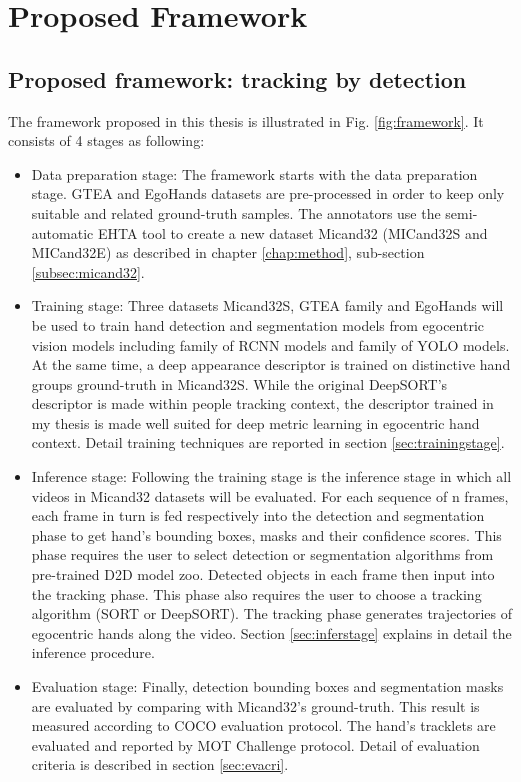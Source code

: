 \chapter{Proposed Framework}\label{chap:framework}
\section{Proposed framework: tracking by detection}
The framework proposed in this thesis is illustrated in Fig. \ref{fig:framework}. It consists of 4 stages as following:
\begin{itemize}

\item Data preparation stage: The framework starts with the data preparation stage. GTEA and EgoHands datasets are pre-processed in order to keep only suitable and related ground-truth samples. The annotators use the semi-automatic EHTA tool to create a new dataset Micand32 (MICand32S and MICand32E) as described in chapter \ref{chap:method}, sub-section \ref{subsec:micand32}.
\item Training stage: Three datasets Micand32S, GTEA family and EgoHands will be used to train hand detection and segmentation models from egocentric vision models including family of RCNN models and family of YOLO models. At the same time, a deep appearance descriptor is trained on distinctive hand groups ground-truth in Micand32S. While the original DeepSORT's descriptor is made within people tracking context, the descriptor trained in my thesis is made well suited for deep metric learning in egocentric hand context. Detail training techniques are reported in section \ref{sec:trainingstage}.
\item Inference stage: Following the training stage is the inference stage in which all videos in Micand32 datasets will be evaluated. For each sequence of n frames, each frame in turn is fed respectively into the detection and segmentation phase to get hand’s bounding boxes, masks and their confidence scores. This phase requires the user to select detection or segmentation algorithms from pre-trained D2D model zoo. Detected objects in each frame then input into the tracking phase. This phase also requires the user to choose a tracking algorithm (SORT or DeepSORT). The tracking phase generates trajectories of egocentric hands along the video. Section \ref{sec:inferstage} explains in detail the inference procedure.
\item Evaluation stage: Finally, detection bounding boxes and segmentation masks are evaluated by comparing with Micand32’s ground-truth. This result is measured according to COCO evaluation protocol. The hand’s tracklets are evaluated and reported by MOT Challenge protocol. Detail of evaluation criteria is described in section \ref{sec:evacri}.
\end{itemize}
